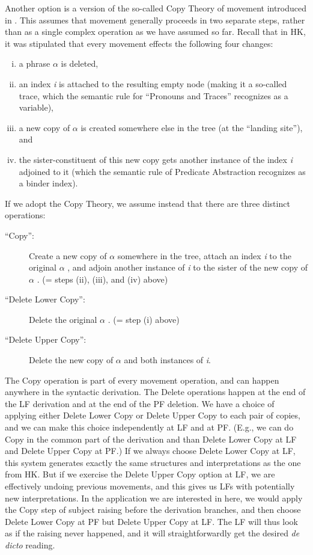 Another option is a version of the so-called Copy Theory of movement introduced in \citet{chomsky:1993:minimalist}. This assumes that movement generally proceeds in two separate steps, rather than as a single complex operation as we have assumed so far. Recall that in H\amp K, it was stipulated that every movement effects the following four changes:
\begin{enumerate}
	[(i)] 
	\item a phrase $\alpha$ is deleted, 
	\item an index \emph{i} is attached to the resulting empty node (making it a so-called trace, which the semantic rule for ``Pronouns and Traces'' recognizes as a variable), 
	\item a new copy of $\alpha$ is created somewhere else in the tree (at the ``landing site''), and 
	\item the sister-constituent of this new copy gets another instance of the index \emph{i} adjoined to it (which the semantic rule of Predicate Abstraction recognizes as a binder index). 
\end{enumerate}

If we adopt the Copy Theory, we assume instead that there are three distinct operations:
\begin{description}
	
	\item[``Copy'':] Create a new copy of $\alpha$ somewhere in the tree, attach an index \emph{i} to the original $\alpha$ , and adjoin another instance of \emph{i} to the sister of the new copy of $\alpha$ . (= steps (ii), (iii), and (iv) above)
	
	\item[``Delete Lower Copy'':] Delete the original $\alpha$ . (= step (i) above)
	
	\item[``Delete Upper Copy'':] Delete the new copy of $\alpha$ and both instances of \emph{i}.
\end{description}

\noindent The Copy operation is part of every movement operation, and can happen anywhere in the syntactic derivation. The Delete operations happen at the end of the LF derivation and at the end of the PF deletion. We have a choice of applying either Delete Lower Copy or Delete Upper Copy to each pair of copies, and we can make this choice independently at LF and at PF. (E.g., we can do Copy in the common part of the derivation and than Delete Lower Copy at LF and Delete Upper Copy at PF.) If we always choose Delete Lower Copy at LF, this system generates exactly the same structures and interpretations as the one from H\amp K. But if we exercise the Delete Upper Copy option at LF, we are effectively undoing previous movements, and this gives us LFs with potentially new interpretations. In the application we are interested in here, we would apply the Copy step of subject raising before the derivation branches, and then choose Delete Lower Copy at PF but Delete Upper Copy at LF. The LF will thus look as if the raising never happened, and it will straightforwardly get the desired \emph{de dicto} reading.


